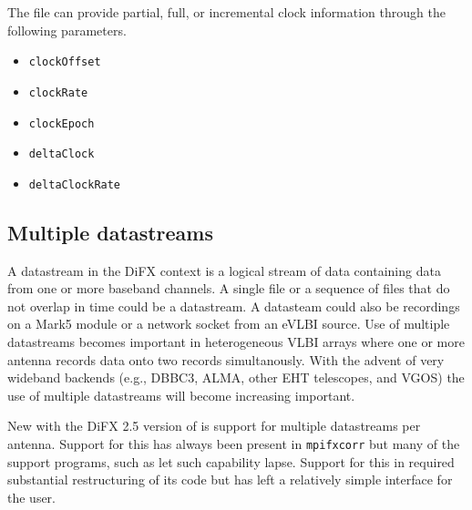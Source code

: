\documentclass[12pt]{article}
\begin{document}
The \vd file can provide partial, full, or incremental clock information through the following parameters.
\begin{itemize}
\item {\tt clockOffset}
\item {\tt clockRate}
\item {\tt clockEpoch}
\item {\tt deltaClock}
\item {\tt deltaClockRate}
\end{itemize}






\subsection{Multiple datastreams} \label{sec:mds}

A datastream in the DiFX context is a logical stream of data containing data from one or more baseband channels.
A single file or a sequence of files that do not overlap in time could be a datastream.  A datasteam could also be recordings on a Mark5 module or a network socket from an eVLBI source.
Use of multiple datastreams becomes important in heterogeneous VLBI arrays where one or more antenna records data onto two records simultanously.
With the advent of very wideband backends (e.g., DBBC3, ALMA, other EHT telescopes, and VGOS) the use of multiple datastreams will become increasing important.

New with the DiFX 2.5 version of \vexdifx is support for multiple datastreams per antenna.
Support for this has always been present in {\tt mpifxcorr} but many of the support programs, such as \vexdifx let such capability lapse.
Support for this in \vexdifx required substantial restructuring of its code but has left a relatively simple interface for the user.
\end{document}
